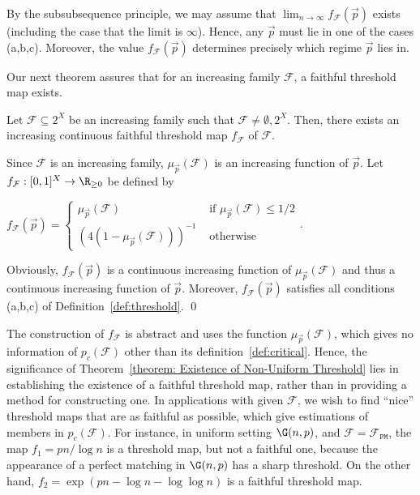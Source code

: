 \documentclass[12pt]{article}
\begin{document}
By the subsubsequence principle, we may assume  that $\lim_{n\to\infty} f_{\mathcal{F}}(\vec{p})$ exists (including the case that the limit is $\infty$). Hence, any $\vec{p}$ must lie in one of the cases (a,b,c). Moreover, the value $f_{\mathcal{F}}(\vec{p})$ determines precisely which regime $\vec{p}$ lies in.

Our next theorem assures that for an increasing family ${\mathcal F}$, a faithful threshold map exists.


\begin{theorem}
\label{theorem: Existence of Non-Uniform Threshold}
Let $\mathcal{F}\subseteq 2^X$ be an increasing family such that $\mathcal{F}\neq\emptyset, 2^X$. Then, there exists an increasing continuous faithful threshold map $f_{\mathcal{F}}$ of $\mathcal{F}$.
\end{theorem}

\proof 
Since $\mathcal{F}$ is an increasing family, $\mu_{\vec{p}}(\mathcal{F})$ is an increasing function of $\vec{p}$. Let  $f_{\mathcal{F}}:[0,1]^X\rightarrow\R_{\geq 0}$ be defined by
\begin{center}
    $f_{\mathcal{F}}(\vec{p}) = \begin{cases} \mu_{\vec{p}}(\mathcal{F}) &\text{ if } \mu_{\vec{p}}(\mathcal{F})\le 1/2\\ 
    (4(1-\mu_{\vec{p}}(\mathcal{F})))^{-1} &\text{ otherwise}\end{cases}$.
\end{center}
Obviously, $f_{\mathcal{F}}(\vec{p})$ is a continuous increasing function of $\mu_{\vec{p}}(\mathcal{F})$ and thus a continuous increasing function of $\vec{p}$. Moreover, $f_{\mathcal{F}}(\vec{p})$ satisfies all conditions (a,b,c) of Definition~\ref{def:threshold}.   \qed
\medskip


The construction of $f_{\mathcal{F}}$ is abstract and uses the function $\mu_{\vec{p}}({\mathcal F})$, which gives no information of $p_c({\mathcal F})$ other than its definition~\eqref{def:critical}. Hence, the significance of Theorem~\ref{theorem: Existence of Non-Uniform Threshold} lies in establishing the existence of a faithful threshold map, rather than in providing a method for constructing one.
In applications with given ${\mathcal F}$, we wish to find ``nice'' threshold maps that are as faithful as possible, which give estimations of members in $p_c({\mathcal F})$. For instance, in uniform setting $\G(n,p)$, and ${\mathcal F}={\mathcal F}_{\texttt{PM}}$, the map $f_1=pn/\log n$ is a threshold map, but not a faithful one, because the appearance of a perfect matching in $\G(n,p)$ has a sharp threshold. On the other hand, $f_2=\exp(pn-\log n-\log\log n)$ is a faithful threshold map.
\end{document}
